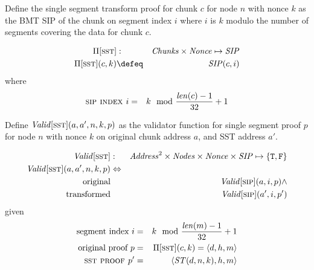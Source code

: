 \begin{definition}
\label{def:sst-proof}
Define the single segment transform proof for chunk $c$ for node $n$ with nonce $k$ as the BMT SIP of the chunk on segment index $i$ where $i$ is $k$ modulo the number of segments covering the data for chunk $c$.


\begin{eqnarray}
\Pi[\textsc{\lowercase{SST}}] &:& \mathit{Chunks}\times\mathit{Nonce}\mapsto\mathit{SIP}\\
\Pi[\textsc{\lowercase{SST}}](c,k) &\defeq& \mathit{SIP}(c,i) 
\end{eqnarray}
where
\begin{eqnarray}
\text{\sc{sip} index } i&=&k \mod \frac{\mathit{len}(c)-1}{32}+1
\end{eqnarray}
\end{definition}


\begin{definition}
\label{def:sst-validation}
Define $\mathit{Valid}[\textsc{\lowercase{SST}}](a, a', n, k, p)$ as the validator function for single segment proof $p$ for node $n$ with nonce $k$ on original chunk address $a$, and SST address $a'$.

\begin{eqnarray}
\mathit{Valid}[\textsc{\lowercase{SST}}]&:& 
\mathit{Address}^2\times\mathit{Nodes}\times\mathit{Nonce}\times\mathit{SIP}\mapsto \{\mathtt{T,F}\}
\\
\mathit{Valid}[\textsc{\lowercase{SST}}](a,a',n,k,p)&\Leftrightarrow&\\
\text{original}&&\mathit{Valid}[\textsc{\lowercase{SIP}}](a, i, p)\land\\
\text{transformed}&&\mathit{Valid}[\textsc{\lowercase{SIP}}](a', i, p')
\end{eqnarray}
given
\begin{eqnarray}
\text{segment index } i &=&k \mod\frac{\mathit{len}(m)-1}{32}+1\\
 \text{original proof } p& = &\Pi[\textsc{\lowercase{SST}}](c,k)=    \langle d,h, m\rangle\\
 \text{\sc{sst} proof } p' &=&\langle \mathit{ST}(d,n,k),h, m\rangle
\end{eqnarray}
\end{definition}


